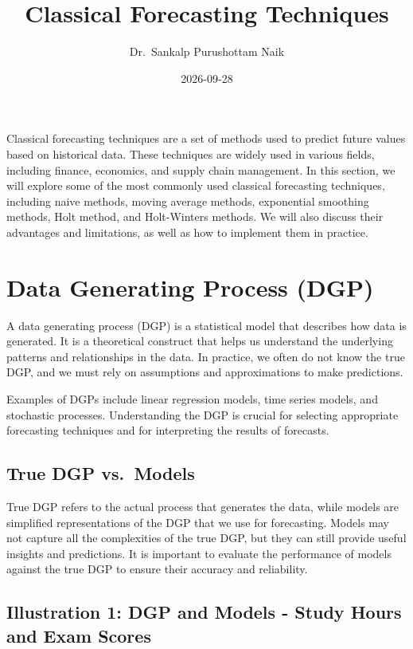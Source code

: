 \documentclass[
  a4paper,
]{article}
\title{Classical Forecasting Techniques}
\author{Dr.~Sankalp Purushottam Naik}
\date{2026-09-28}
\renewcommand*\contentsname{Table of contents}
\newcommand\contentsname{Table of contents}
\begin{document}
\maketitle

\renewcommand*\contentsname{Table of contents}
{
\setcounter{tocdepth}{3}
\tableofcontents
}

\thispagestyle{fancy}

Classical forecasting techniques are a set of methods used to predict
future values based on historical data. These techniques are widely used
in various fields, including finance, economics, and supply chain
management. In this section, we will explore some of the most commonly
used classical forecasting techniques, including naive methods, moving
average methods, exponential smoothing methods, Holt method, and
Holt-Winters methods. We will also discuss their advantages and
limitations, as well as how to implement them in practice.

\section{Data Generating Process
(DGP)}\label{data-generating-process-dgp}

A data generating process (DGP) is a statistical model that describes
how data is generated. It is a theoretical construct that helps us
understand the underlying patterns and relationships in the data. In
practice, we often do not know the true DGP, and we must rely on
assumptions and approximations to make predictions.

Examples of DGPs include linear regression models, time series models,
and stochastic processes. Understanding the DGP is crucial for selecting
appropriate forecasting techniques and for interpreting the results of
forecasts.

\subsection{True DGP vs.~Models}\label{true-dgp-vs.-models}

True DGP refers to the actual process that generates the data, while
models are simplified representations of the DGP that we use for
forecasting. Models may not capture all the complexities of the true
DGP, but they can still provide useful insights and predictions. It is
important to evaluate the performance of models against the true DGP to
ensure their accuracy and reliability.

\subsection{Illustration 1: DGP and Models - Study Hours and Exam
Scores}\label{illustration-1-dgp-and-models---study-hours-and-exam-scores}
\end{document}
